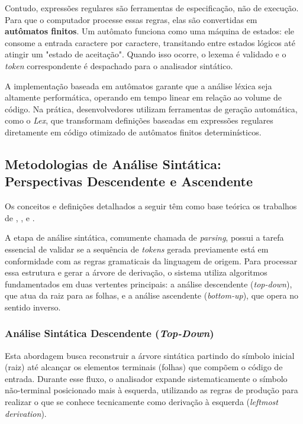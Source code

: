 Contudo, expressões regulares são ferramentas de especificação, não de execução. Para que o computador processe essas regras, elas são convertidas em \textbf{autômatos finitos}. Um autômato funciona como uma máquina de estados: ele consome a entrada caractere por caractere, transitando entre estados lógicos até atingir um "estado de aceitação". Quando isso ocorre, o lexema é validado e o \textit{token} correspondente é despachado para o analisador sintático.

A implementação baseada em autômatos garante que a análise léxica seja altamente performática, operando em tempo linear em relação ao volume de código. Na prática, desenvolvedores utilizam ferramentas de geração automática, como o \textit{Lex}, que transformam definições baseadas em expressões regulares diretamente em código otimizado de autômatos finitos determinísticos.


\subsection{Metodologias de Análise Sintática: Perspectivas Descendente e Ascendente}

Os conceitos e definições detalhados a seguir têm como base teórica os trabalhos de , ,  e .

A etapa de análise sintática, comumente chamada de \textit{parsing}, possui a tarefa essencial de validar se a sequência de \textit{tokens} gerada previamente está em conformidade com as regras gramaticais da linguagem de origem. Para processar essa estrutura e gerar a árvore de derivação, o sistema utiliza algoritmos fundamentados em duas vertentes principais: a análise descendente (\textit{top-down}), que atua da raiz para as folhas, e a análise ascendente (\textit{bottom-up}), que opera no sentido inverso.

\subsubsection*{Análise Sintática Descendente (\textit{Top-Down})}
Esta abordagem busca reconstruir a árvore sintática partindo do símbolo inicial (raiz) até alcançar os elementos terminais (folhas) que compõem o código de entrada. Durante esse fluxo, o analisador expande sistematicamente o símbolo não-terminal posicionado mais à esquerda, utilizando as regras de produção para realizar o que se conhece tecnicamente como derivação à esquerda (\textit{leftmost derivation}).

